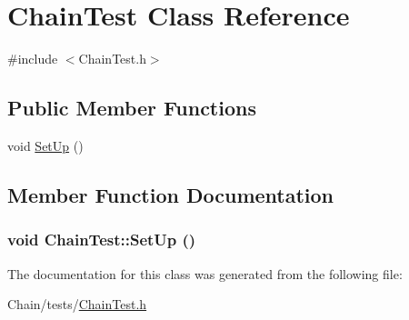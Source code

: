\hypertarget{classChainTest}{
\section{ChainTest Class Reference}
\label{classChainTest}
}


{\ttfamily \#include $<$ChainTest.h$>$}\subsection*{Public Member Functions}
\begin{DoxyCompactItemize}
\item 
void \hyperlink{classChainTest_afdf731179b3288e59761640ff644f01a}{SetUp} ()
\end{DoxyCompactItemize}


\subsection{Member Function Documentation}
\hypertarget{classChainTest_afdf731179b3288e59761640ff644f01a}{
\subsubsection[{SetUp}]{\setlength{\rightskip}{0pt plus 5cm}void ChainTest::SetUp ()}}
\label{classChainTest_afdf731179b3288e59761640ff644f01a}


The documentation for this class was generated from the following file:\begin{DoxyCompactItemize}
\item 
Chain/tests/\hyperlink{ChainTest_8h}{ChainTest.h}\end{DoxyCompactItemize}
